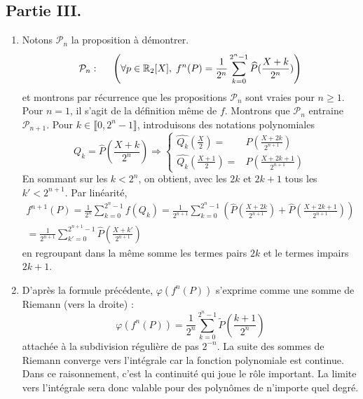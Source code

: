 \subsection*{Partie III.}
\begin{enumerate}
 \item Notons $\mathcal{P}_n$ la proposition à démontrer.
\begin{displaymath}
\mathcal{P}_n: \hspace{0.5cm} \left( \forall p \in \mathbb{R}_2[X], \; f^n(P) = \frac{1}{2^n}\sum_{k=0}^{2^n-1}\widehat{P}(\frac{X+k}{2^n})\right)  
\end{displaymath}
et montrons par récurrence que les propositions $\mathcal{P}_n$ sont vraies pour $n\geq 1$.\newline
Pour $n=1$, il s'agit de la définition même de $f$.\newline
Montrons que $\mathcal{P}_n$ entraine $\mathcal{P}_{n+1}$. Pour $k\in \llbracket 0 , 2^{n}-1 \rrbracket$, introduisons des notations polynomiales
\begin{displaymath}
 Q_k = \widehat{P}(\frac{X+k}{2^n})
\Rightarrow 
\left\lbrace 
\begin{aligned}
\widehat{Q_k}(\frac{X}{2}) =& \widehat{P}(\frac{X + 2k}{2^{n+1}}) \\
\widehat{Q_k}(\frac{X+1}{2}) =& \widehat{P}(\frac{X + 2k+1}{2^{n+1}}) 
\end{aligned}
\right. 
\end{displaymath}
En sommant sur les $k<2^{n}$, on obtient, avec les $2k$ et $2k+1$ tous les $k'<2^{n+1}$. Par linéarité,
\begin{multline*}
 f^{n+1}(P)
 = \frac{1}{2^n}\sum_{k=0}^{2^n -1} f(Q_k)
 = \frac{1}{2^{n+1}}\sum_{k=0}^{2^n -1}\left( \widehat{P}(\frac{X + 2k}{2^{n+1}}) + \widehat{P}(\frac{X + 2k+1}{2^{n+1}}) \right) \\
 = \frac{1}{2^{n+1}}\sum_{k'=0}^{2^{n+1} -1} \widehat{P}(\frac{X + k'}{2^{n+1}})
\end{multline*}
en regroupant dans la même somme les termes pairs $2k$ et le termes impairs $2k+1$.

 \item D'après la formule précédente, $\varphi(f^n(P))$ s'exprime comme une somme de Riemann (vers la droite) :
\begin{displaymath}
\varphi(f^n(P)) =  
\frac{1}{2^n}\sum_{k=0}^{2^n-1}\widetilde{P}(\frac{k+1}{2^n})
\end{displaymath}
 attachée à la subdivision régulière de pas $2^{-n}$. La suite des sommes de Riemann converge vers l'intégrale car la fonction polynomiale est continue.\newline
Dans ce raisonnement, c'est la continuité qui joue le rôle important. La limite vers l'intégrale sera donc valable pour des polynômes de n'importe quel degré. 
\end{enumerate}
